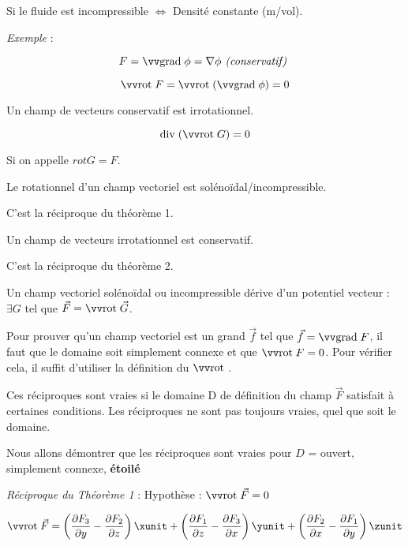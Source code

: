  Si le fluide est incompressible $\Leftrightarrow$ Densité constante (m/vol).
 
 \textit{ Exemple} :

 \[F= \gradt \phi = \nabla \phi \textit{ (conservatif) }\]

 \[\rot F = \rot ( \gradt \phi ) =0\]

 \begin{mytheo}
 Un champ de vecteurs conservatif est irrotationnel.
 \end{mytheo}

 \[\divt ( \rot G ) = 0\]

 Si on appelle $rot G = F$.

 \begin{mytheo}
 Le rotationnel d'un champ vectoriel est solénoïdal/incompressible.
 \end{mytheo}


 \begin{mytheo}
 C'est la réciproque du théorème 1.


 Un champ de vecteurs irrotationnel est conservatif.
 \end{mytheo}


 \begin{mytheo}
C'est la réciproque du théorème 2.

 Un champ vectoriel solénoïdal ou incompressible dérive d'un potentiel vecteur : $\exists G$ tel que $\vec F = \rot \vec G$.
 \end{mytheo}
 \begin{myrem}

Pour prouver qu'un champ vectoriel est un grand $\vec f $ tel que $\vec f = \gradt F$, il faut que le domaine soit simplement connexe et que $\rot F=0$. Pour vérifier cela, il suffit d'utiliser la définition du $\rot$.

 \end{myrem}
 Ces réciproques sont vraies si le domaine D de définition du champ $\vec F$ satisfait à certaines conditions. Les réciproques ne sont pas toujours vraies, quel que soit le domaine.

 Nous allons démontrer que les réciproques sont vraies pour $D$ = ouvert, simplement connexe, \textbf{étoilé}


 \textit{Réciproque du Théorème 1} : Hypothèse : $\rot \vec F =0$

 \[\rot \vec F
=\left( \frac{\partial F_3}{\partial y } -  \frac{\partial F_2}{\partial z }\right) \xunit
+\left( \frac{\partial F_1}{\partial z } -  \frac{\partial F_3}{\partial x }\right) \yunit
+\left( \frac{\partial F_2}{\partial x } -  \frac{\partial F_1}{\partial y }\right) \zunit
\]

